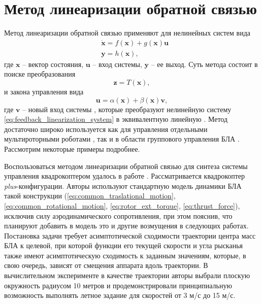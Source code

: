 \section{Метод линеаризации обратной связью}

Метод линеаризации обратной связью применяют для нелинейных систем вида
\begin{equation} \label{eq:feedback_linearization_system}
\begin{aligned}
&\dot{\bm x} = f(\bm x) + g(\bm x) \bm u\\
&\bm y = h(\bm x),
\end{aligned}
\end{equation}
где $\bm x$ -- вектор состояния, $\bm u$ -- вход системы, $\bm y$ -- ее выход.
Суть метода состоит в поиске преобразования 
\begin{equation} \label{eq:feedback_linearization_transform}
\bm z = T(\bm x),
\end{equation}
и закона управления вида
\begin{equation} \label{eq:feedback_linearization_control}
\bm u = \alpha(\bm x) + \beta(\bm x) \bm v,
\end{equation}
где $\bm v$ -- новый вход системы , которые преобразуют нелинейную систему \eqref{eq:feedback_linearization_system} в эквивалентную линейную \cite{Slotine01}. Метод достаточно широко используется как для управления отдельными мультироторными роботами \cite{Chang01, Freddi01}, так и в области группового управления БЛА \cite{Mahmood01}. Рассмотрим некоторые примеры подробнее.

Воспользоваться методом линеаризации обратной связью для синтеза системы управления квадрокоптером удалось в работе \cite{Roza01}. Рассматривается квадрокоптер \textit{plus}-конфигурации. Авторы используют стандартную модель динамики БЛА такой конструкции (\ref{eq:common_traslational_motion}, \ref{eq:common_rotational_motion}, \ref{eq:rotor_ext_torque}, \ref{eq:thrust_force}), исключив силу аэродинамического сопротивления, при этом пояснив, что планируют добавить в модель это и другие возмущения в следующих работах. Постановка задачи требует асимптотической сходимости траектории центра масс БЛА к целевой, при которой функции его текущей скорости и угла рысканья также имеют асимптотическую сходимость к заданным значениям, которые, в свою очередь, зависят от смещения аппарата вдоль траектории. В вычислительном эксперименте в качестве траектории авторы выбрали плоскую окружность радиусом 10 метров и продемонстрировали принципиальную возможность выполнять летное задание для скоростей от 3 м/с до 15 м/с.

